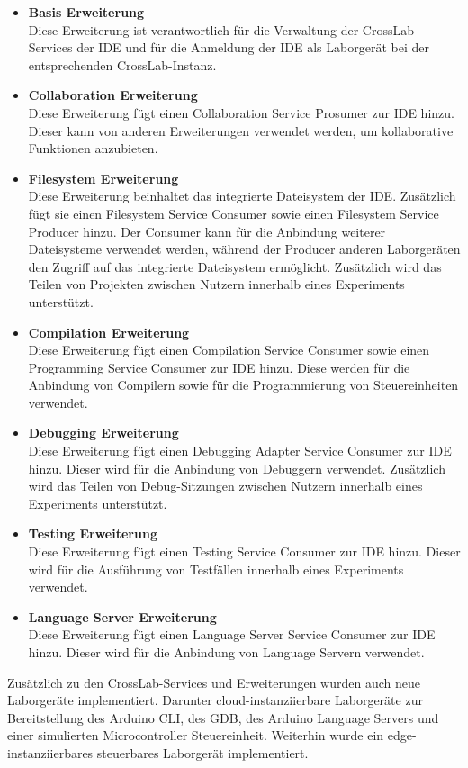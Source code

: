\begin{itemize}
    \item \textbf{Basis Erweiterung} \\ Diese Erweiterung ist verantwortlich für die Verwaltung der CrossLab-Services der IDE und für die Anmeldung der IDE als Laborgerät bei der entsprechenden CrossLab-Instanz.
    \item \textbf{Collaboration Erweiterung} \\ Diese Erweiterung fügt einen Collaboration Service Prosumer zur IDE hinzu. Dieser kann von anderen Erweiterungen verwendet werden, um kollaborative Funktionen anzubieten.
    \item \textbf{Filesystem Erweiterung} \\ Diese Erweiterung beinhaltet das integrierte Dateisystem der IDE. Zusätzlich fügt sie einen Filesystem Service Consumer sowie einen Filesystem Service Producer hinzu. Der Consumer kann für die Anbindung weiterer Dateisysteme verwendet werden, während der Producer anderen Laborgeräten den Zugriff auf das integrierte Dateisystem ermöglicht. Zusätzlich wird das Teilen von Projekten zwischen Nutzern innerhalb eines Experiments unterstützt.
    \item \textbf{Compilation Erweiterung} \\ Diese Erweiterung fügt einen Compilation Service Consumer sowie einen Programming Service Consumer zur IDE hinzu. Diese werden für die Anbindung von Compilern sowie für die Programmierung von Steuereinheiten verwendet.
    \item \textbf{Debugging Erweiterung} \\ Diese Erweiterung fügt einen Debugging Adapter Service Consumer zur IDE hinzu. Dieser wird für die Anbindung von Debuggern verwendet. Zusätzlich wird das Teilen von Debug-Sitzungen zwischen Nutzern innerhalb eines Experiments unterstützt.
    \item \textbf{Testing Erweiterung} \\ Diese Erweiterung fügt einen Testing Service Consumer zur IDE hinzu. Dieser wird für die Ausführung von Testfällen innerhalb eines Experiments verwendet.
    \item \textbf{Language Server Erweiterung} \\ Diese Erweiterung fügt einen Language Server Service Consumer zur IDE hinzu. Dieser wird für die Anbindung von Language Servern verwendet.
\end{itemize}

Zusätzlich zu den CrossLab-Services und Erweiterungen wurden auch neue Laborgeräte implementiert. Darunter cloud-instanziierbare Laborgeräte zur Bereitstellung des \ac{Arduino CLI}, des \ac{GDB}, des Arduino Language Servers und einer simulierten Microcontroller Steuereinheit. Weiterhin wurde ein edge-instanziierbares steuerbares Laborgerät implementiert.

